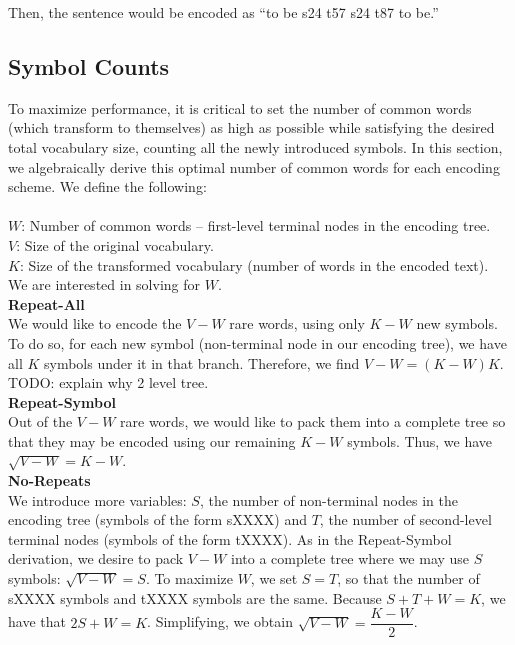 Then, the sentence would be encoded as ``to be s24 t57 s24 t87 to be.''

\subsection{Symbol Counts}
To maximize performance, it is critical to set the number of common words (which
transform to themselves) as high as possible while satisfying the desired total vocabulary size,
counting all the newly introduced symbols. In this section, we algebraically derive
this optimal number of common words for each encoding scheme. We define the following:\\\\
$W$: Number of common words -- first-level terminal nodes in the encoding tree.\\
$V$: Size of the original vocabulary.\\
$K$: Size of the transformed vocabulary (number of words in the encoded text).\\

We are interested in solving for $W$.\\

\textbf{Repeat-All}\\
We would like to encode the $V - W$ rare words, using only $K - W$ new symbols. To do so,
for each new symbol (non-terminal node in our encoding tree), we have all $K$ symbols under
it in that branch. Therefore, we find $V - W = (K - W)K$.\\

TODO: explain why 2 level tree.\\

\textbf{Repeat-Symbol}\\
Out of the $V - W$ rare words, we would like to pack them into a complete tree so that
they may be encoded using our remaining $K - W$ symbols. Thus, we have $\sqrt{V - W} = K - W$.\\

\textbf{No-Repeats}\\
We introduce more variables: $S$, the number of non-terminal nodes in the encoding tree (symbols
of the form sXXXX) and $T$, the number of second-level terminal nodes (symbols of the form tXXXX).
As in the Repeat-Symbol derivation, we desire to pack $V - W$ into a complete tree where we
may use $S$ symbols: $\sqrt{V - W} = S$. To maximize $W$, we set $S = T$, so that the number of sXXXX symbols and tXXXX
symbols are the same. Because $S + T + W = K$, we have that $2S + W = K$. Simplifying, we obtain
$\sqrt{V - W} = \dfrac{K - W}{2}$.\\
